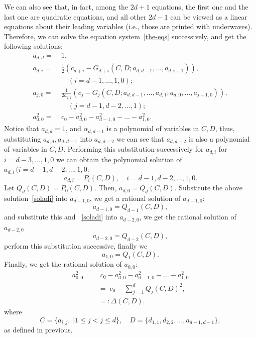 \documentclass[runningheads]{llncs}
\newcommand{\Qo}{\Delta}
\begin{document}
We can also see that, in fact, among the $2d+1$ equations, the first one and the last one are quadratic equations, and all other $2d-1$ can be viewed as a linear equations about their leading variables (i.e., those are printed with underwaves).  
Therefore, we can solve the equation system~\eqref{the-eqs} successively, and get the following solutions:
\begin{align*}
a_{d,d}=&\;1,\\
a_{d,i}=&\;\frac{1}{2}\left(c_{d+i}-G_{d+i}(C,D; a_{d,d-1},\ldots,a_{d,i+1})\right), \\
&\; \quad (i=d-1,\ldots,1,0);\\
a_{j,0}=&\;\frac{1}{2a_{j,j}}\left(c_j-G_j(C,D; a_{d,d-1},\ldots,a_{d,1};a_{d,0},\ldots,a_{j+1,0})\right),\\
&\; \quad (j=d-1,d-2,\ldots,1);\\
a_{0,0}^2=&\;c_0-a_{d,0}^2-a_{d-1,0}^2-\ldots-a_{1,0}^2.
\end{align*}
Notice that $a_{d,d}=1$, and $\alpha_{d,d-1}$ is a polynomial of variables in $C,D$, thus, substituting $a_{d,d},a_{d,d-1}$ into $a_{d,d-2}$ we can see that $a_{d,d-2}$ is also a polynomial of variables in $C,D$. Performing this substitution successively for $a_{d,i}$ for $i=d-3,\ldots,1,0$ we can obtain the polynomial solution of $a_{d,i}\,(i=d-1,d-2,\ldots,1,0$:
\begin{equation}
a_{d,i}=P_i(C,D), \quad i=d-1,d-2,\ldots,1,0.
\label{soladi}
\end{equation}
Let $Q_d(C,D)=P_0(C,D)$. Then, $a_{d,0}=Q_d(C,D)$.  
Substitute the above solution~\eqref{soladi} into $a_{d-1,0}$, we get a rational solution of $a_{d-1,0}$:
$$
a_{d-1,0}=Q_{d-1}(C,D),
$$
and substitute this and ~\eqref{soladi} into $a_{d-2,0}$, we get
the rational solution of $a_{d-2,0}$
$$
a_{d-2,0}=Q_{d-2}(C,D),
$$
perform this substitution successive, finally we 
$$
a_{1,0}=Q_{1}(C,D).
$$
Finally, we get the rational solution of $a_{0,0}$:
\begin{align*}
a_{0,0}^2=&\;c_0-a_{d,0}^2-a_{d-1,0}^2-\ldots-a_{1,0}^2\\
&=\;c_0-\sum_{j=1}^{d}Q_j(C,D)^2,\\
&=:{\Qo}(C,D).
\end{align*}
where
$$
C=\{a_{i,j},\;| 1\leq j<j\leq d\}, 
\quad
D=\{d_{1,1},d_{2,2},\ldots,a_{d-1,d-1}\}, 
$$
as defined in previous.  
\end{document}
